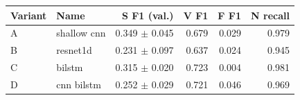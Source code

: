 \begin{tabular}{llrrrr}
\toprule
Variant & Name & S F1 (val.) & V F1 & F F1 & N recall \\
\midrule
A & shallow cnn & 0.349 $\pm$ 0.045 & 0.679 & 0.029 & 0.979 \\
B & resnet1d & 0.231 $\pm$ 0.097 & 0.637 & 0.024 & 0.945 \\
C & bilstm & 0.315 $\pm$ 0.020 & 0.723 & 0.004 & 0.981 \\
D & cnn bilstm & 0.252 $\pm$ 0.029 & 0.721 & 0.046 & 0.969 \\
\bottomrule
\end{tabular}
